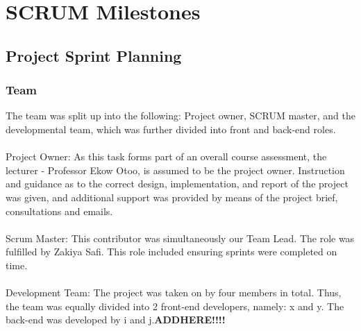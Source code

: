 \documentclass[paper=a4, fontsize=11pt]{scrartcl}
\numberwithin{equation}{section}		%
\numberwithin{figure}{section}			%
\numberwithin{table}{section}				%
\begin{document}
\section{SCRUM Milestones}

\subsection{Project Sprint Planning}

\subsubsection{Team}
The team was split up into the following: Project owner, SCRUM master, and the developmental team, which was further divided into front and back-end roles.\\\\Project Owner: As this task forms part of an overall course assessment, the lecturer - Professor Ekow Otoo, is assumed to be the project owner. Instruction and guidance as to the correct design, implementation, and report of the project was given, and additional support was provided by means of the project brief, consultations and emails.\\\\Scrum Master: This contributor was simultaneously our Team Lead. The role was fulfilled by Zakiya Safi. This role included ensuring sprints were completed on time.\\\\Development Team: The project was taken on by four members in total. Thus, the team was equally divided into 2 front-end developers, namely: x and y. The back-end was developed by i and j.\huge\textbf{ADDHERE!!!!}\normalsize
\end{document}

